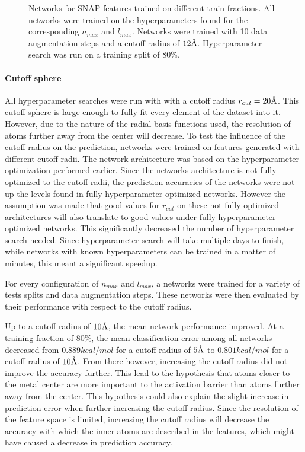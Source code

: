 \begin{figure}[!htb]
  \endminipage
  \caption[Learning curves for different SNAP resolutions]{
  Networks for SNAP features trained on different train fractions.
  All networks were trained on the hyperparameters found for the corresponding $n_{max}$ and $l_{max}$.
  Networks were trained with 10 data augmentation steps and a cutoff radius of $12 \AA$.
  Hyperparameter search was run on a training split of 80\%.
  }
  \label{fig:snap_hyperparameter}
\end{figure}

\paragraph{Cutoff sphere}
All hyperparameter searches were run with with a cutoff radius $r_{cut} = 20 \AA$.
This cutoff sphere is large enough to fully fit every element of the dataset into it.
However, due to the nature of the radial basis functions used, the resolution of atoms 
further away from the center will decrease.
To test the influence of the cutoff radius on the prediction, 
networks were trained on features generated with different cutoff radii.
The network architecture was based on the hyperparameter optimization performed earlier.
Since the networks architecture is not fully optimized to the cutoff radii, the prediction accuracies
of the networks were not up the levels found in fully hyperparameter optimized networks.
However the assumption was made that good values for $r_{cut}$ on these not fully optimized architectures 
will also translate to good values under fully hyperparameter optimized networks.
This significantly decreased the number of hyperparameter search needed.
Since hyperparameter search will take multiple days to finish, while networks with known hyperparameters
can be trained in a matter of minutes, this meant a significant speedup.


For every configuration of $n_{max}$ and $l_{max}$, a networks were trained for a variety 
of tests splits and data augmentation steps.
These networks were then evaluated by their performance with respect to the cutoff radius.

Up to a cutoff radius of $10 \AA$, the mean network performance improved. %
At a training fraction of 80\%, the mean classification error among 
all networks decreased from $0.889 kcal/mol$ for a cutoff radius of $5 \AA$ to 
$0.801 kcal/mol$ for a cutoff radius of $10 \AA$.
From there however, increasing the cutoff radius did not improve the accuracy further.
This lead to the hypothesis that atoms closer to the metal center are more important to the activation barrier than atoms further away from the center.
This hypothesis could also explain the slight increase in prediction error when further increasing the cutoff radius.
Since the resolution of the feature space is limited, increasing the cutoff radius will decrease the accuracy 
with which the inner atoms are described in the features, which might have caused a decrease in prediction accuracy.

